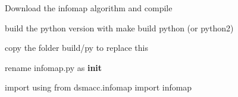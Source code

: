 
\begin{DoxyEnumerate}
\item Download the infomap algorithm and compile
\item build the python version with make build python (or python2)
\item copy the folder build/py to replace this
\item rename infomap.\+py as {\bfseries init}
\item import using {\ttfamily from dsmacc.\+infomap import infomap} 
\end{DoxyEnumerate}